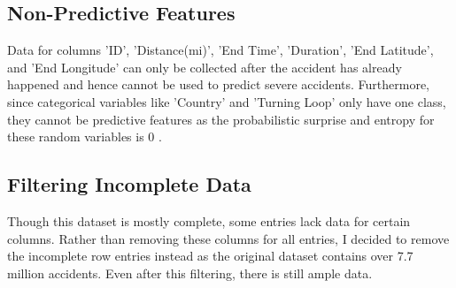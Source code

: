 \subsection{Non-Predictive Features}
Data for columns 'ID', 'Distance(mi)', 'End Time', 'Duration', 'End Latitude', and 'End Longitude' can only be collected after the accident has already happened and hence cannot be used to predict severe accidents. Furthermore, since categorical variables like 'Country' and 'Turning Loop' only have one class, they cannot be predictive features as the probabilistic surprise and entropy for these random variables is 0 \citep{lesne2014shannon}.

\subsection{Filtering Incomplete Data}
Though this dataset is mostly complete, some entries lack data for certain columns. Rather than removing these columns for all entries, I decided to remove the incomplete row entries instead as the original dataset contains over 7.7 million accidents. Even after this filtering, there is still ample data.

